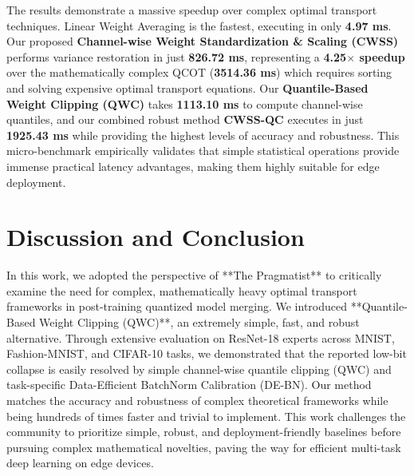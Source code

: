 \documentclass{article}
\theoremstyle{plain}
\theoremstyle{definition}
\theoremstyle{remark}
\begin{document}
The results demonstrate a massive speedup over complex optimal transport techniques. Linear Weight Averaging is the fastest, executing in only \textbf{4.97 ms}. Our proposed \textbf{Channel-wise Weight Standardization \& Scaling (CWSS)} performs variance restoration in just \textbf{826.72 ms}, representing a \textbf{4.25$\times$ speedup} over the mathematically complex QCOT (\textbf{3514.36 ms}) which requires sorting and solving expensive optimal transport equations. Our \textbf{Quantile-Based Weight Clipping (QWC)} takes \textbf{1113.10 ms} to compute channel-wise quantiles, and our combined robust method \textbf{CWSS-QC} executes in just \textbf{1925.43 ms} while providing the highest levels of accuracy and robustness. This micro-benchmark empirically validates that simple statistical operations provide immense practical latency advantages, making them highly suitable for edge deployment.

\section{Discussion and Conclusion}
In this work, we adopted the perspective of **The Pragmatist** to critically examine the need for complex, mathematically heavy optimal transport frameworks in post-training quantized model merging. We introduced **Quantile-Based Weight Clipping (QWC)**, an extremely simple, fast, and robust alternative. Through extensive evaluation on ResNet-18 experts across MNIST, Fashion-MNIST, and CIFAR-10 tasks, we demonstrated that the reported low-bit collapse is easily resolved by simple channel-wise quantile clipping (QWC) and task-specific Data-Efficient BatchNorm Calibration (DE-BN). Our method matches the accuracy and robustness of complex theoretical frameworks while being hundreds of times faster and trivial to implement. This work challenges the community to prioritize simple, robust, and deployment-friendly baselines before pursuing complex mathematical novelties, paving the way for efficient multi-task deep learning on edge devices.
\end{document}
